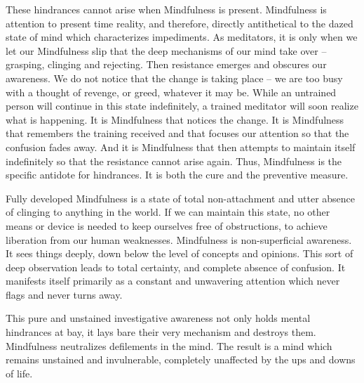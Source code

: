 These hindrances cannot arise when Mindfulness is present. Mindfulness is
attention to present time reality, and therefore, directly antithetical to the
dazed state of mind which characterizes impediments. As meditators, it is only
when we let our Mindfulness slip that the deep mechanisms of our mind take over
--grasping, clinging and rejecting. Then resistance emerges and obscures our
awareness. We do not notice that the change is taking place -- we are too busy
with a thought of revenge, or greed, whatever it may be. While an untrained
person will continue in this state indefinitely, a trained meditator will soon
realize what is happening.  It is Mindfulness that notices the change. It is
Mindfulness that remembers the training received and that focuses our attention
so that the confusion fades away. And it is Mindfulness that then attempts to
maintain itself indefinitely so that the resistance cannot arise again. Thus,
Mindfulness is the specific antidote for hindrances. It is both the cure and the
preventive measure.

Fully developed Mindfulness is a state of total non-attachment and utter absence
of clinging to anything in the world. If we can maintain this state, no other
means or device is needed to keep ourselves free of obstructions, to achieve
liberation from our human weaknesses. Mindfulness is non-superficial awareness.
It sees things deeply, down below the level of concepts and opinions. This sort
of deep observation leads to total certainty, and complete absence of confusion.
It manifests itself primarily as a constant and unwavering attention which never
flags and never turns away.

This pure and unstained investigative awareness not only holds mental hindrances
at bay, it lays bare their very mechanism and destroys them. Mindfulness
neutralizes defilements in the mind. The result is a mind which remains
unstained and invulnerable, completely unaffected by the ups and downs of life.
